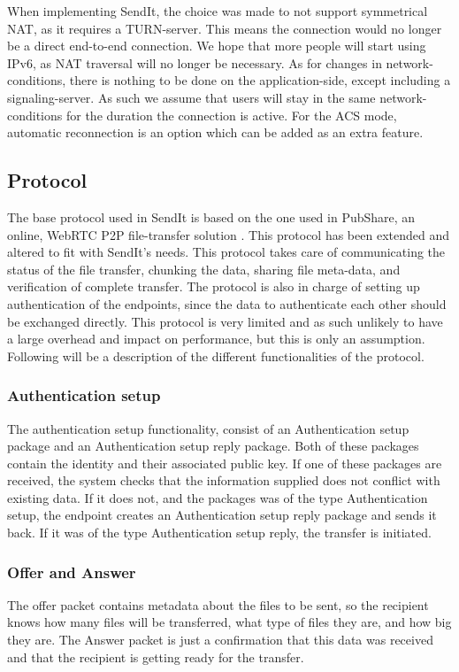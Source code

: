 			When implementing SendIt, the choice was made to not support symmetrical NAT, as it requires a TURN-server. This means the connection would no longer be a direct end-to-end connection. We hope that more people will start using IPv6, as NAT traversal will no longer be necessary. As for changes in network-conditions, there is nothing to be done on the application-side, except including a signaling-server. As such we assume that users will stay in the same network-conditions for the duration the connection is active. For the ACS mode, automatic reconnection is an option which can be added as an extra feature.
	\subsection{Protocol}
	The base protocol used in SendIt is based on the one used in PubShare, an online, WebRTC P2P file-transfer solution \cite{url_pubshare}. This protocol has been extended and altered to fit with SendIt's needs. This protocol takes care of communicating the status of the file transfer, chunking the data, sharing file meta-data, and verification of complete transfer. The protocol is also in charge of setting up authentication of the endpoints, since the data to authenticate each other should be exchanged directly. This protocol is very limited and as such unlikely to have a large overhead and impact on performance, but this is only an assumption. Following will be a description of the different functionalities of the protocol.

	\subsubsection*{Authentication setup}
	The authentication setup functionality, consist of an Authentication setup package and an Authentication setup reply package. Both of these packages contain the identity and their associated public key. If one of these packages are received, the system checks that the information supplied does not conflict with existing data. If it does not, and the packages was of the type Authentication setup, the endpoint creates an Authentication setup reply package and sends it back. If it was of the type Authentication setup reply, the transfer is initiated.

	\subsubsection*{Offer and Answer}
	The offer packet contains metadata about the files to be sent, so the recipient knows how many files will be transferred, what type of files they are, and how big they are. The Answer packet is just a confirmation that this data was received and that the recipient is getting ready for the transfer.

